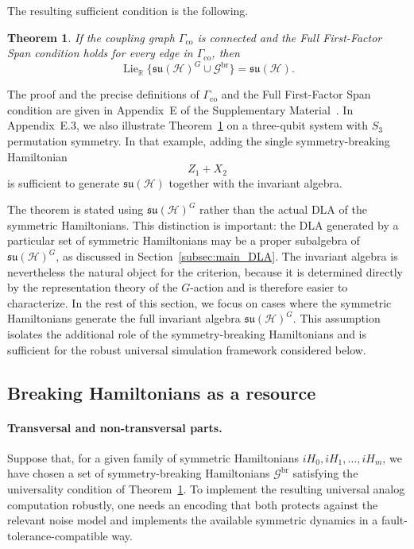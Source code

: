 \documentclass[10pt,twocolumn,superscriptaddress,aps,amsmath,amssymb,citeautoscript,floatfix,prx,longbibliography]{revtex4-2}
\newcounter{alg}
\newtheorem{theorem}{Theorem}
\theoremstyle{plain}
\theoremstyle{plain}
\theoremstyle{plain}
\theoremstyle{plain}
\theoremstyle{plain}
\theoremstyle{plain}
\begin{document}
The resulting sufficient condition is the following.

\begin{theorem}\label{thm:breakers_suff_cond}
If the coupling graph $\Gamma_{\mathrm{co}}$ is connected and the Full First-Factor Span condition holds for every edge in $\Gamma_{\mathrm{co}}$, then
$$
\operatorname{Lie}_{\mathbb R}
\{\mathfrak{su}(\mathcal H)^G\cup\mathcal G^{\mathrm{br}}\}
=
\mathfrak{su}(\mathcal H).
$$
\end{theorem}

The proof and the precise definitions of $\Gamma_{\mathrm{co}}$ and the Full First-Factor Span condition are given in Appendix~E of the Supplementary Material~\cite{SuppMat}. In Appendix~E.3, we also illustrate Theorem~\ref{thm:breakers_suff_cond} on a three-qubit system with $S_3$ permutation symmetry. In that example, adding the single symmetry-breaking Hamiltonian
$$
Z_1+X_2
$$
is sufficient to generate $\mathfrak{su}(\mathcal H)$ together with the invariant algebra.

The theorem is stated using $\mathfrak{su}(\mathcal H)^G$ rather than the actual DLA of the symmetric Hamiltonians. This distinction is important: the DLA generated by a particular set of symmetric Hamiltonians may be a proper subalgebra of $\mathfrak{su}(\mathcal H)^G$, as discussed in Section~\ref{subsec:main_DLA}. The invariant algebra is nevertheless the natural object for the criterion, because it is determined directly by the representation theory of the $G$-action and is therefore easier to characterize. In the rest of this section, we focus on cases where the symmetric Hamiltonians generate the full invariant algebra $\mathfrak{su}(\mathcal H)^G$. This assumption isolates the additional role of the symmetry-breaking Hamiltonians and is sufficient for the robust universal simulation framework considered below.

\subsection{Breaking Hamiltonians as a resource}\label{subsec:main_H_br_resource}

\paragraph{Transversal and non-transversal parts.}

Suppose that, for a given family of symmetric Hamiltonians ${iH_0,iH_1,\ldots,iH_m}$, we have chosen a set of symmetry-breaking Hamiltonians $\mathcal G^{\mathrm{br}}$ satisfying the universality condition of Theorem~\ref{thm:breakers_suff_cond}. To implement the resulting universal analog computation robustly, one needs an encoding that both protects against the relevant noise model and implements the available symmetric dynamics in a fault-tolerance-compatible way.
\end{document}
